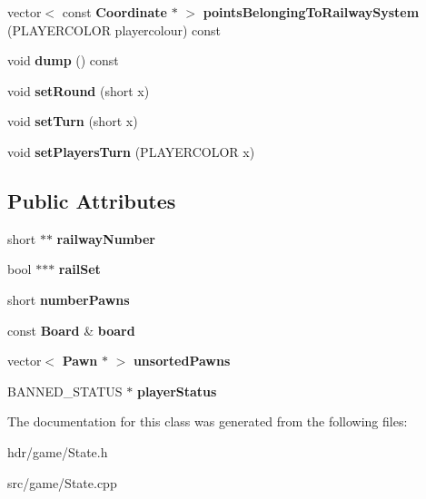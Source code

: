 \begin{DoxyCompactItemize}
\item 
vector$<$ const {\bf Coordinate} $\ast$ $>$ {\bfseries points\-Belonging\-To\-Railway\-System} (P\-L\-A\-Y\-E\-R\-C\-O\-L\-O\-R playercolour) const \label{class_state_aa2169b0cf7c5d5bcd680145f1f34a168}

\item 
void {\bfseries dump} () const \label{class_state_a27499f3070aef89461dbec0c99a24225}

\item 
void {\bfseries set\-Round} (short x)\label{class_state_a468eb35199b879f9df58245540ca849c}

\item 
void {\bfseries set\-Turn} (short x)\label{class_state_a5f8cd95cb039eb5333a9fed80b7efd2f}

\item 
void {\bfseries set\-Players\-Turn} (P\-L\-A\-Y\-E\-R\-C\-O\-L\-O\-R x)\label{class_state_a100c1959a9c60fdcd3400a3fda247588}

\end{DoxyCompactItemize}
\subsection*{Public Attributes}
\begin{DoxyCompactItemize}
\item 
short $\ast$$\ast$ {\bfseries railway\-Number}\label{class_state_aa894bfd06fe70d41f14527401d752bd6}

\item 
bool $\ast$$\ast$$\ast$ {\bfseries rail\-Set}\label{class_state_a06eec6ac8f191d3b7e6bfc85426e37c6}

\item 
short {\bfseries number\-Pawns}\label{class_state_a2bd881ff696f2807e54a4cc0b522f624}

\item 
const {\bf Board} \& {\bfseries board}\label{class_state_a74702298b35b8a798e85212bccff6daa}

\item 
vector$<$ {\bf Pawn} $\ast$ $>$ {\bfseries unsorted\-Pawns}\label{class_state_a7da42bb202d9bb967db82e1b8c65070e}

\item 
B\-A\-N\-N\-E\-D\-\_\-\-S\-T\-A\-T\-U\-S $\ast$ {\bfseries player\-Status}\label{class_state_ab6a551fe108a225babf4fa59e61d75cb}

\end{DoxyCompactItemize}


The documentation for this class was generated from the following files\-:\begin{DoxyCompactItemize}
\item 
hdr/game/State.\-h\item 
src/game/State.\-cpp\end{DoxyCompactItemize}
